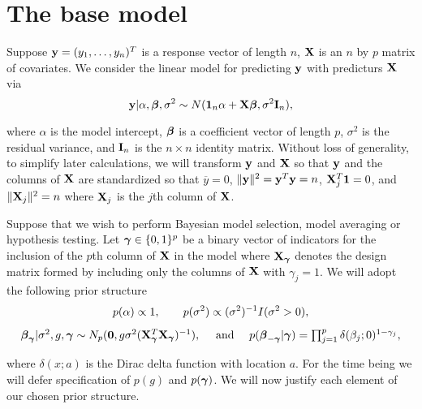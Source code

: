 \documentclass{article}[12pt]
\def\N{N}
\begin{document}
 





\newpage 
\section{The base model}
\label{sec:model}

Suppose ${\bf y} = (y_1,\ldots,y_n)^T$ is a response vector of length $n$, ${\bf X}$ is an $n$ by $p$ matrix 
of covariates. We consider the linear model for predicting ${\bf y}$ with predicturs ${\bf X}$ via
\begin{equation}
\label{eq:linearModel}
{\bf y} | \alpha, {\boldsymbol \beta}, \sigma^2 \sim N({\bf 1}_n\alpha + {\bf X} {\boldsymbol \beta}, \sigma^2 {\bf I}_n),
\end{equation} 


\noindent where $\alpha$ is the model intercept, ${\boldsymbol \beta}$ is a coefficient vector of length $p$, 
$\sigma^2$ is the residual variance, and ${\bf I}_n$ is the $n \times n$ identity matrix. 
Without loss of generality, to simplify later calculations, we will transform ${\bf y}$ and ${\bf X}$ 
so that ${\bf y}$ and the columns of ${\bf X}$ are standardized so that $\overline{y} = 0$, 
$\|{\bf y}\|^2 = {\bf y}^T{\bf y} = n$, ${\bf X}_j^T{\bf 1} = 0$,  and $\|{\bf X}_j\|^2 = n$ where ${\bf X}_j$ is the $j$th  column of ${\bf X}$. 

Suppose that we wish to perform Bayesian model selection, model averaging or hypothesis 
testing. Let ${\boldsymbol \gamma} \in \{0, 1\}^p$ be a binary vector of indicators
for the inclusion of the $p$th column of ${\bf X}$ in the model where ${\bf X}_{\boldsymbol \gamma}$ 
denotes the design matrix formed by including only the columns of ${\bf X}$ with 
$\gamma_j = 1$. We will adopt the following prior structure
\begin{equation}
\label{eq:priorStructure}
\begin{array}{c}
\ds p(\alpha) \propto 1,  
\qquad 
\ds p(\sigma^2) \propto (\sigma^2)^{-1} I(\sigma^2 > 0),                      
\\ [2ex]
\vbeta_\vgamma | \sigma^2, g, \vgamma \sim \N_p(\vzero, g \sigma^2 (\mX_\vgamma^T \mX_\vgamma)^{-1}),
\quad \text{ and }  \quad 
p(\vbeta_{-\vgamma}|\vgamma) = \prod_{j=1}^p \delta(\beta_j;0)^{1-\gamma_j},
\end{array}
\end{equation} 

\noindent where $\delta(x;a)$ is the Dirac delta function with location $a$. 
For the time being we will defer specification of $p(g)$ and $p({\boldsymbol \gamma})$.
We will now justify each element of our chosen prior structure.
\end{document}

